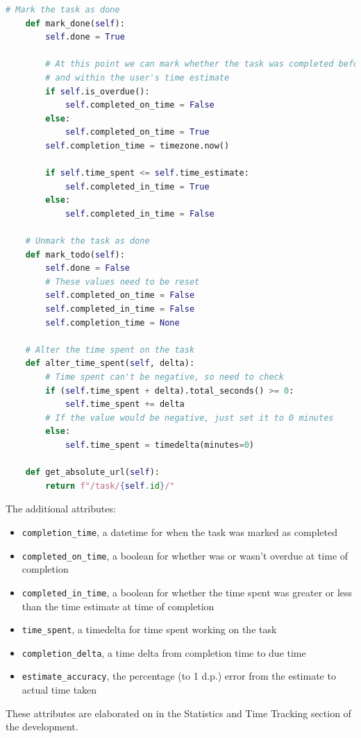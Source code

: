 \documentclass{article}
\begin{document}
\begin{lstlisting}[language=Python]
    # Mark the task as done
    def mark_done(self):
        self.done = True

        # At this point we can mark whether the task was completed before it's due date,
        # and within the user's time estimate
        if self.is_overdue():
            self.completed_on_time = False
        else:
            self.completed_on_time = True
        self.completion_time = timezone.now()

        if self.time_spent <= self.time_estimate:
            self.completed_in_time = True
        else:
            self.completed_in_time = False

    # Unmark the task as done
    def mark_todo(self):
        self.done = False
        # These values need to be reset
        self.completed_on_time = False
        self.completed_in_time = False
        self.completion_time = None

    # Alter the time spent on the task
    def alter_time_spent(self, delta):
        # Time spent can't be negative, so need to check
        if (self.time_spent + delta).total_seconds() >= 0:
            self.time_spent += delta
        # If the value would be negative, just set it to 0 minutes
        else:
            self.time_spent = timedelta(minutes=0)

    def get_absolute_url(self):
        return f"/task/{self.id}/"
\end{lstlisting}

The additional attributes:
\begin{itemize}
  \item \texttt{completion\_time},
    a datetime for when the task was marked as completed
  \item \texttt{completed\_on\_time},
    a boolean for whether was or wasn't overdue at time of completion
  \item \texttt{completed\_in\_time},
    a boolean for whether the time spent was greater or less than the time estimate at time of completion
  \item \texttt{time\_spent},
    a timedelta for time spent working on the task
  \item \texttt{completion\_delta},
    a time delta from completion time to due time
  \item \texttt{estimate\_accuracy},
    the percentage (to 1 d.p.) error from the estimate to actual time taken
\end{itemize}

These attributes are elaborated on in the Statistics and Time Tracking section of the development.
\end{document}
